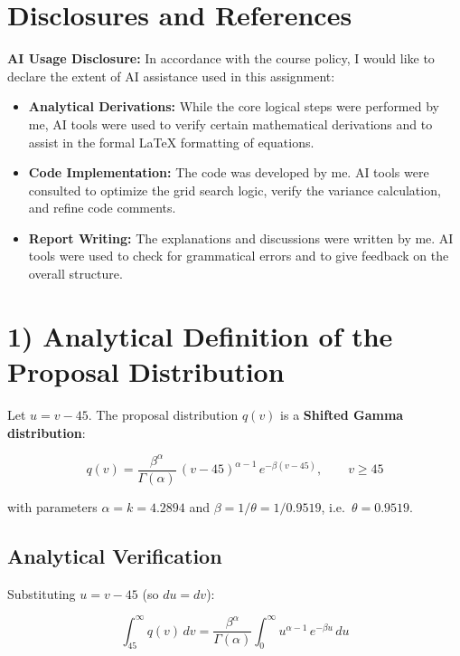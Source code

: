 \documentclass{article}
\begin{document}
\section*{Disclosures and References}

\textbf{AI Usage Disclosure:} In accordance with the course policy, I would like to declare the extent of AI assistance used in this assignment:

\begin{itemize}
    \item \textbf{Analytical Derivations:} While the core logical steps were performed by me, AI tools were used to verify certain mathematical derivations and to assist in the formal LaTeX formatting of equations.
    \item \textbf{Code Implementation:} The code was developed by me. AI tools were consulted to optimize the grid search logic, verify the variance calculation, and refine code comments.
    \item \textbf{Report Writing:} The explanations and discussions were written by me. AI tools were used to check for grammatical errors and to give feedback on the overall structure.
\end{itemize}

\newpage

\section*{1) Analytical Definition of the Proposal Distribution}

Let $u = v - 45$. The proposal distribution $q(v)$ is a \textbf{Shifted Gamma distribution}:

\begin{equation}
    q(v) = \frac{\beta^{\alpha}}{\Gamma(\alpha)}\,(v-45)^{\alpha - 1}\,e^{-\beta(v-45)}, \qquad v \geq 45
\end{equation}

with parameters $\alpha = k = 4.2894$ and $\beta = 1/\theta = 1/0.9519$, i.e.\ $\theta = 0.9519$.

\subsection*{Analytical Verification}

Substituting $u = v - 45$ (so $du = dv$):

\begin{equation}
    \int_{45}^{\infty} q(v)\, dv
    = \frac{\beta^{\alpha}}{\Gamma(\alpha)} \int_{0}^{\infty} u^{\alpha - 1}\, e^{-\beta u}\, du
\end{equation}
\end{document}
